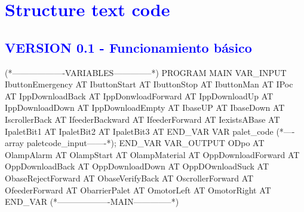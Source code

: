 \newpage
\section{\textcolor{blue}{Structure text code}}
\subsection{\textcolor{blue}{VERSION 0.1 - Funcionamiento básico}}
\begin{small}
\begin{stext}
(*-------------------VARIABLES--------------*)
PROGRAM MAIN
VAR_INPUT
    IbuttonEmergency AT %
    IbuttonStart AT %
    IbuttonStop AT %
    IbuttonMan AT %
    IPoc AT %
    IppDownloadBack AT %
    IppDonwloadForward AT %
    IppDownloadUp AT %
    IppDownloadDown AT %
    IppDownloadEmpty AT %
    IbaseUP AT %
    IbaseDown AT %
    IscrollerBack AT %
    IfeederBackward AT %
    IfeederForward AT %
    IexistsABase AT %
    IpaletBit1 AT %
    IpaletBit2 AT %
    IpaletBit3 AT %
END_VAR
VAR
    palet_code (*----array paletcode_input-------*);
END_VAR
VAR_OUTPUT
    ODpo  AT %
    OlampAlarm  AT %
    OlampStart AT %
    OlampMaterial AT %
    OppDownloadForward AT %
    OppDownloadBack AT %
    OppDownloadDown AT %
    OppDOwnloadSuck AT %
    ObaseRejectForward AT %
    ObaseVerifyBack AT %
    OscrollerForward AT %
    OfeederForward  AT %
    ObarrierPalet AT %
    OmotorLeft AT %
    OmotorRight AT %
END_VAR
(*-------------------MAIN--------------*)

\end{stext}
\end{small}
